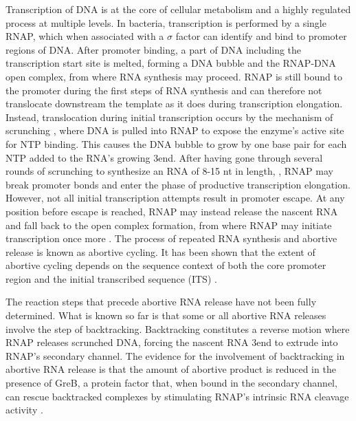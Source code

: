%
Transcription of DNA is at the core of cellular metabolism and a highly
regulated process at multiple levels. In bacteria, transcription is performed
by a single RNAP, which when associated with a $\sigma$ factor can identify
and bind to promoter regions of DNA. After promoter binding, a part of DNA
including the transcription start site is melted, forming a DNA bubble and the
RNAP-DNA open complex, from where RNA synthesis may proceed. RNAP is still
bound to the promoter during the first steps of RNA synthesis and can
therefore not translocate downstream the template as it does during
transcription elongation. Instead, translocation during initial transcription
occurs by the mechanism of scrunching \cite{revyakin_abortive_2006,
kapanidis_initial_2006}, where DNA is pulled into RNAP to expose the enzyme's
active site for NTP binding. This causes the DNA bubble to grow by one base
pair for each NTP added to the RNA's growing 3\ppp end. After having
gone through several rounds of scrunching to synthesize an RNA of 8-15 nt in
length,
\cite{carpousis_cycling_1980,hsu_vitro_2003,tang_real-time_2009,hsu_initial_2006},
RNAP may break promoter bonds and enter the phase of productive transcription
elongation. However, not all initial transcription attempts result in promoter
escape. At any position before escape is reached, RNAP may instead release the
nascent RNA and fall back to the open complex formation, from where RNAP may
initiate transcription once more \cite{carpousis_cycling_1980}. The process of
repeated RNA synthesis and abortive release is known as abortive cycling. It
has been shown that the extent of abortive cycling depends on the sequence
context of both the core promoter region and the initial transcribed
sequence (ITS) \cite{hsu_initial_2006, hsu_promoter_2002, vo_vitro_2003}.

The reaction steps that precede abortive RNA release have not been fully
determined. What is known so far is that some or all abortive RNA releases
involve the step of backtracking. Backtracking constitutes a reverse motion
where RNAP releases scrunched DNA, forcing the nascent RNA 3\ppp end to
extrude into RNAP's secondary channel. The evidence for the involvement of
backtracking in abortive RNA release is that the amount of abortive product is
reduced in the presence of GreB, a protein factor that, when bound in the
secondary channel, can rescue backtracked complexes by stimulating RNAP's
intrinsic RNA cleavage activity
\cite{hsu_initial_2006,hsu_escherichia_1995,feng_grea-induced_1994}.

